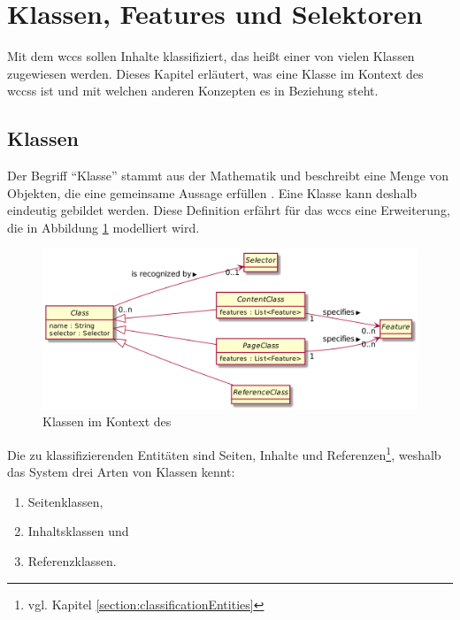 \section{Klassen, Features und Selektoren}
    \label{section:conceptClassesFeaturesSelectors}
    Mit dem \gls{wccs} sollen Inhalte klassifiziert,
    das heißt einer von vielen Klassen zugewiesen werden.
    Dieses Kapitel erläutert, was eine Klasse im Kontext des \glspl{wccs} ist
    und mit welchen anderen Konzepten es in Beziehung steht.

    \subsection{Klassen}
        Der Begriff "`Klasse"' stammt aus der Mathematik und beschreibt eine Menge von Objekten,
        die eine gemeinsame Aussage erfüllen \cite{oberschelp:Mengenlehre}.
        Eine Klasse kann deshalb eindeutig gebildet werden.
        Diese Definition erfährt für das \gls{wccs} eine Erweiterung,
        die in Abbildung \ref{image:conceptClasses} modelliert wird.

        \begin{figure}[htb]
            \centering
            \includegraphics[scale=\imageScalingFactor]{../resources/concept/classes.png}
            \caption{Klassen im Kontext des }
            \label{image:conceptClasses}
        \end{figure}

        Die zu klassifizierenden Entitäten sind Seiten, Inhalte und
        Referenzen\footnote{vgl. Kapitel \ref{section:classificationEntities}},
        weshalb das System drei Arten von Klassen kennt:

        \begin{enumerate}
            \item Seitenklassen,
            \item Inhaltsklassen und
            \item Referenzklassen.
        \end{enumerate}

